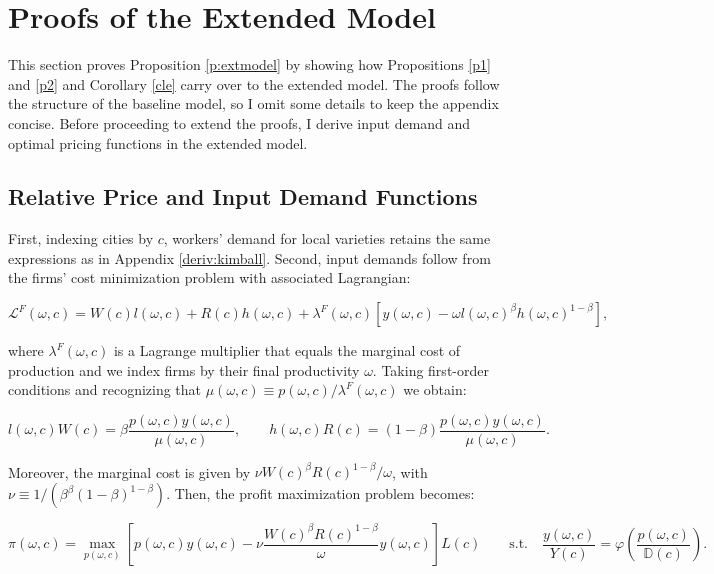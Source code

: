 \newpage
\section{Proofs of the Extended Model}\label{a:proofext}

This section proves Proposition \ref{p:extmodel} by showing how Propositions \ref{p1} and \ref{p2} and Corollary \ref{cle} carry over to the extended model. The proofs follow the structure of the baseline model, so I omit some details to keep the appendix concise. Before proceeding to extend the proofs, I derive input demand and optimal pricing functions in the extended model. 

\subsection{Relative Price and Input Demand Functions}\label{s:inputext}
First, indexing cities by $c$, workers' demand for local varieties retains the same expressions as in Appendix \ref{deriv:kimball}. Second, input demands follow from the firms' cost minimization problem with associated Lagrangian:

\begin{equation*}
\mathcal{L}^F(\omega,c) = W(c) l(\omega,c) + R(c) h(\omega,c) + \lambda^F(\omega,c) \left[y(\omega,c) - \omega l(\omega,c)^\beta h(\omega,c)^{1-\beta}\right],
\end{equation*}

where $\lambda^F(\omega,c)$ is a Lagrange multiplier that equals the marginal cost of production and we index firms by their final productivity $\omega$. Taking first-order conditions and recognizing that $\mu(\omega,c) \equiv p(\omega,c)/\lambda^F(\omega,c)$ we obtain:

\begin{equation*}
	l(\omega,c) W(c) = \beta \frac{p(\omega,c) y(\omega,c)}{\mu(\omega,c)}, \qquad h(\omega,c) R(c) = (1-\beta) \frac{p(\omega,c) y(\omega,c)}{\mu(\omega,c)}.
\end{equation*}

Moreover, the marginal cost is given by $\nu W(c)^\beta R(c)^{1-\beta}/\omega$, with $\nu \equiv 1/(\beta^\beta (1-\beta)^{1-\beta})$. Then, the profit maximization problem becomes:

\begin{equation*}
	\pi(\omega, c) = \max_{p(\omega,c)} \left[p(\omega,c) y(\omega,c) - \nu \frac{W(c)^\beta R(c)^{1-\beta}}{\omega} y(\omega,c)\right]L(c) \qquad \text{s.t.} \quad \frac{y(\omega,c)}{Y(c)} = \varphi\left(\frac{p(\omega,c)}{\mathbb{D}(c)}\right).
\end{equation*}

